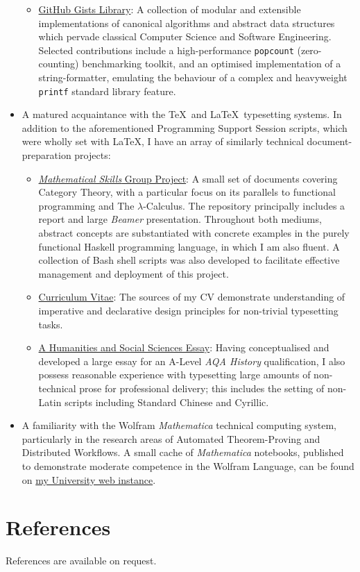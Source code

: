 \documentclass{article}
\newcommand{\githublink}[2]{\href{https://github.com/oliverdixon/#1}{#2}}
\newcommand{\gistlink}[2]{\href{https://gist.github.com/oliverdixon/#1}{#2}}
\newcommand{\weblink}[2]{\href{https://www-users.york.ac.uk/~od641/#1}{#2}}
\begin{document}
\begin{itemize}
\begin{itemize}
                \item \gistlink{}{GitHub Gists Library}: A collection of modular
                and extensible implementations of canonical algorithms and
                abstract data structures which pervade classical Computer
                Science and Software Engineering. Selected contributions
                include a high-performance \texttt{popcount} (zero-counting)
                benchmarking toolkit, and an optimised implementation of a
                string-formatter, emulating the behaviour of a complex and
                heavyweight \texttt{printf} standard library feature.
        \end{itemize}
        \item A matured acquaintance with the \TeX\ and \LaTeX\ typesetting
        systems. In addition to the aforementioned Programming Support Session
        scripts, which were wholly set with \LaTeX, I have an array of similarly
        technical document-preparation projects:
        \begin{itemize}
                \item \githublink{MS1GP}{\textit{Mathematical Skills} Group
                Project}: A small set of documents covering Category Theory,
                with a particular focus on its parallels to functional
                programming and The $\lambda$-Calculus. The repository
                principally includes a report and large \textit{Beamer}
                presentation. Throughout both mediums, abstract concepts are
                substantiated with concrete examples in the purely functional
                Haskell programming language, in which I am also fluent. A
                collection of Bash shell scripts was also developed to
                facilitate effective management and deployment of this project.

                \item \githublink{cv}{Curriculum Vitae}: The sources of my CV
                demonstrate understanding of imperative and declarative design
                principles for non-trivial typesetting tasks.

                \item \githublink{opium}{A Humanities and Social Sciences
                Essay}: Having conceptualised and developed a large essay for an
                A-Level \textit{AQA History} qualification, I also possess
                reasonable experience with typesetting large amounts of
                non-technical prose for professional delivery; this includes the
                setting of non-Latin scripts including Standard Chinese and
                Cyrillic.
        \end{itemize}
        \item A familiarity with the Wolfram \textit{Mathematica} technical
        computing system, particularly in the research areas of Automated
        Theorem-Proving and Distributed Workflows. A small cache of
        \textit{Mathematica} notebooks, published to demonstrate moderate
        competence in the Wolfram Language, can be found on
        \weblink{misc\_mma}{my University web instance}.
\end{itemize}
%
%
\section{References}
References are available on request.
%
\end{document}

